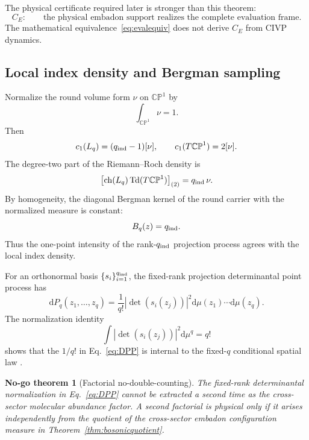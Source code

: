 \documentclass[aps,prd,preprint,nofootinbib,superscriptaddress]{revtex4-2}
\newtheorem{nogotheorem}[theorem]{No-go theorem}
\theoremstyle{definition}
\theoremstyle{remark}
\newcommand{\dd}{\mathrm d}
\newcommand{\CP}{\mathbb{CP}}
\begin{document}
The physical certificate required later is stronger than this theorem:
\begin{equation}
C_E:
\qquad
\text{the physical embadon support realizes the complete evaluation frame.}
\label{eq:CE}
\end{equation}
The mathematical equivalence~\eqref{eq:evalequiv} does not derive $C_E$ from CIVP dynamics.

\subsection{Local index density and Bergman sampling}

Normalize the round volume form $\nu$ on $\CP^1$ by
\begin{equation}
\int_{\CP^1}\nu=1.
\end{equation}
Then
\begin{equation}
c_1(L_q)=(q_{\rm ind}-1)[\nu],
\qquad
c_1(T\CP^1)=2[\nu].
\end{equation}
The degree-two part of the Riemann--Roch density is
\begin{equation}
\left[
{\rm ch}(L_q)\,{\rm Td}(T\CP^1)
\right]_{(2)}
=
q_{\rm ind}\,\nu.
\label{eq:localindexdensity}
\end{equation}
By homogeneity, the diagonal Bergman kernel of the round carrier with the normalized measure is constant:
\begin{equation}
B_q(z)=q_{\rm ind}.
\label{eq:bergmandiagonal}
\end{equation}
Thus the one-point intensity of the rank-$q_{\rm ind}$ projection process agrees with the local index density.

For an orthonormal basis $\{s_i\}_{i=1}^{q_{\rm ind}}$, the fixed-rank projection determinantal point process has
\begin{equation}
\dd P_q(z_1,\ldots,z_q)
=
\frac1{q!}
\left|
\det(s_i(z_j))
\right|^2
\dd\mu(z_1)\cdots\dd\mu(z_q).
\label{eq:DPP}
\end{equation}
The normalization identity
\begin{equation}
\int
\left|\det(s_i(z_j))\right|^2
\dd\mu^q
=
q!
\label{eq:andreief}
\end{equation}
shows that the $1/q!$ in Eq.~\eqref{eq:DPP} is internal to the fixed-$q$ conditional spatial law \cite{Lemoine2026,Eum2026}.

\begin{nogotheorem}[Factorial no-double-counting]
\label{thm:nodoublefactorial}
The fixed-rank determinantal normalization in Eq.~\eqref{eq:DPP} cannot be extracted a second time as the cross-sector molecular abundance factor.  A second factorial is physical only if it arises independently from the quotient of the cross-sector embadon configuration measure in Theorem~\ref{thm:bosonicquotient}.
\end{nogotheorem}
\end{document}
